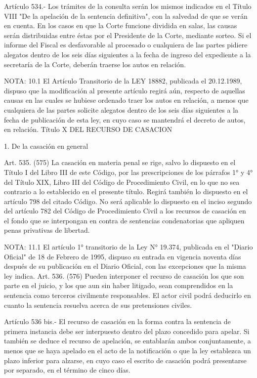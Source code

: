     Artículo 534.- Los trámites de la consulta serán los mismos indicados en el Título VIII "De la apelación de la sentencia definitiva", con la salvedad de que se verán en cuenta. En los casos en que la Corte funcione dividida en salas, las causas serán distribuidas entre éstas por el Presidente de la Corte, mediante sorteo.
    Si el informe del Fiscal es desfavorable al procesado o cualquiera de las partes pidiere alegatos dentro de los seis días siguientes a la fecha de ingreso del expediente a la secretaría de la Corte, deberán traerse los autos en relación.



NOTA:  10.1
    El Artículo Transitorio de la LEY 18882, publicada el 20.12.1989, dispuso que la modificación al presente artículo regirá aún, respecto de aquellas causas en las cuales se hubiese ordenado traer los autos en relación, a menos que cualquiera de las partes solicite alegatos dentro de los seis días siguientes a la fecha de publicación de esta ley, en cuyo caso se mantendrá el decreto de autos, en relación.
    Título X
    DEL RECURSO DE CASACION

    1. De la casación en general

    Art. 535. (575) La casación en materia penal se rige, salvo lo dispuesto en el Título I del Libro III de este Código, por las prescripciones de los párrafos 1° y 4° del Título XIX, Libro III del Código de Procedimiento Civil, en lo que no sea contrario a lo establecido en el presente título. Regirá también lo dispuesto en el artículo 798 del citado Código.
    No será aplicable lo dispuesto en el inciso segundo del artículo 782 del Código de Procedimiento Civil a los recursos de casación en el fondo que se interpongan en contra de sentencias condenatorias que apliquen penas privativas de libertad.

NOTA:  11.1
    El artículo 1° transitorio de la Ley N° 19.374, publicada en el "Diario Oficial" de 18 de Febrero de 1995, dispuso su entrada en vigencia noventa días después de su publicación en el Diario Oficial, con las excepciones que la misma ley indica.
    Art. 536. (576) Pueden interponer el recurso de casación los que son parte en el juicio, y los que aun sin haber litigado, sean comprendidos en la sentencia como terceros civilmente responsables.
    El actor civil podrá deducirlo en cuanto la sentencia resuelva acerca de sus pretensiones civiles.


    Artículo 536 bis.- El recurso de casación en la forma contra la sentencia de primera instancia debe ser interpuesto dentro del plazo concedido para apelar.
    Si también se deduce el recurso de apelación, se entablarán ambos conjuntamente, a menos que se haya apelado en el acto de la notificación o que la ley establezca un plazo inferior para alzarse, en cuyo caso el escrito de casación podrá presentarse por separado, en el término de cinco días.

